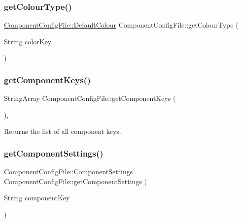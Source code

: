\subsubsection{\texorpdfstring{get\+Colour\+Type()}{getColourType()}}
{\footnotesize\ttfamily \mbox{\hyperlink{classComponentConfigFile_a9bf86058d7f64d6ba94770c3dbf3cad8}{Component\+Config\+File\+::\+Default\+Colour}} Component\+Config\+File\+::get\+Colour\+Type (\begin{DoxyParamCaption}\item[{String}]{color\+Key }\end{DoxyParamCaption})}

\mbox{\label{classComponentConfigFile_a5d5fb2db80da161d553e60d0ad16241e}} 
\subsubsection{\texorpdfstring{get\+Component\+Keys()}{getComponentKeys()}}
{\footnotesize\ttfamily String\+Array Component\+Config\+File\+::get\+Component\+Keys (\begin{DoxyParamCaption}{ }\end{DoxyParamCaption})\hspace{0.3cm}{\ttfamily [static]}, {\ttfamily [protected]}}

\begin{DoxyReturn}{Returns}
the list of all component keys. 
\end{DoxyReturn}
\mbox{\label{classComponentConfigFile_a708a5f5d09bb6f8bc00857eaa7bbc943}} 
\subsubsection{\texorpdfstring{get\+Component\+Settings()}{getComponentSettings()}}
{\footnotesize\ttfamily \mbox{\hyperlink{classComponentConfigFile_1_1ComponentSettings}{Component\+Config\+File\+::\+Component\+Settings}} Component\+Config\+File\+::get\+Component\+Settings (\begin{DoxyParamCaption}\item[{String}]{component\+Key }\end{DoxyParamCaption})}

